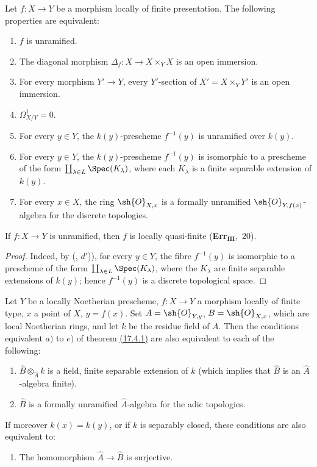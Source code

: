 \begin{corollary}[17.4.2]
\label{IV.17.4.2}
Let $f:X\to Y$ be a morphism locally of finite presentation.
The following properties are equivalent:
\begin{enumerate}[label=(\alph*)]
  \item $f$ is unramified.
  \item The diagonal morphism $\Delta_f:X\to X\times_Y X$ is an open immersion.
  \item[b')] For every morphism $Y'\to Y$, every $Y'$-section of $X'=X\times_Y Y'$ is an open immersion.
  \item $\Omega^1_{X/Y}=0$.
  \item For every $y\in Y$, the $k(y)$-prescheme $f^{-1}(y)$ is unramified over $k(y)$.
  \item[d')] For every $y\in Y$, the $k(y)$-prescheme $f^{-1}(y)$ is isomorphic to a prescheme of the form $\coprod_{\lambda\in L}\Spec(K_\lambda)$, where each $K_\lambda$ is a finite separable extension of $k(y)$.
  \item For every $x\in X$, the ring $\sh{O}_{X,x}$ is a formally unramified $\sh{O}_{Y,f(x)}$-algebra for the discrete topologies.
\end{enumerate}
\end{corollary}

\begin{corollary}[17.4.3]
\label{IV.17.4.3}
If $f:X\to Y$ is unramified, then $f$ is locally quasi-finite (\textbf{Err}$_\textbf{III}$,~20).
\end{corollary}

\begin{proof}
Indeed, by (, $d'$)), for every $y\in Y$, the fibre $f^{-1}(y)$ is isomorphic to a prescheme of the form $\coprod_{\lambda\in L}\Spec(K_\lambda)$, where the $K_\lambda$ are finite separable extensions of $k(y)$; hence $f^{-1}(y)$ is a discrete topological space.
\end{proof}

\begin{proposition}[17.4.4]
\label{IV.17.4.4}
Let $Y$ be a locally Noetherian prescheme, $f:X\to Y$ a morphism locally of finite type, $x$ a point of $X$, $y=f(x)$.
Set $A=\sh{O}_{Y,y}$, $B=\sh{O}_{X,x}$, which are local Noetherian rings, and let $k$ be the residue field of $A$.
Then the conditions equivalent $a)$ to $e)$ of theorem {\hyperlink{ega4.c04.thm.17-4-1}{(17.4.1)}} are also equivalent to each of the following:
\begin{enumerate}
  \item[f)] $\hat{B}\otimes_{\hat{A}}k$ is a field, finite separable extension of $k$ (which implies that $\hat{B}$ is an $\hat{A}$-algebra finite).
  \item[f')] $\hat{B}$ is a formally unramified $\hat{A}$-algebra for the adic topologies.
\end{enumerate}
If moreover $k(x)=k(y)$, or if $k$ is separably closed, these conditions are also equivalent to:
\begin{enumerate}
  \item[f'')] The homomorphism $\hat{A}\to\hat{B}$ is surjective.
\end{enumerate}
\end{proposition}


